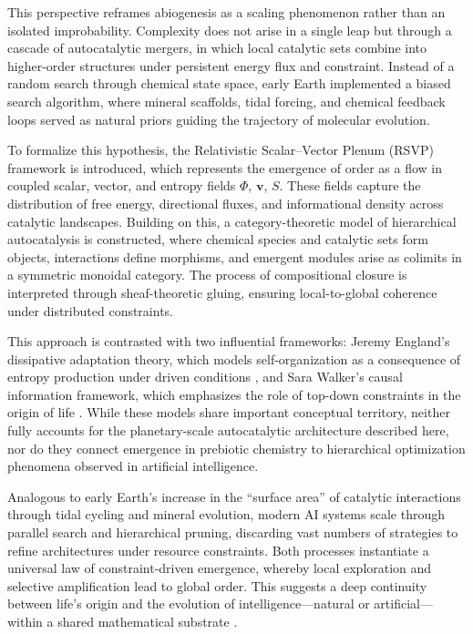 \documentclass{book}
\begin{document}
This perspective reframes abiogenesis as a scaling phenomenon rather than an isolated improbability. Complexity does not arise in a single leap but through a cascade of autocatalytic mergers, in which local catalytic sets combine into higher-order structures under persistent energy flux and constraint. Instead of a random search through chemical state space, early Earth implemented a biased search algorithm, where mineral scaffolds, tidal forcing, and chemical feedback loops served as natural priors guiding the trajectory of molecular evolution.

To formalize this hypothesis, the Relativistic Scalar–Vector Plenum (RSVP) framework is introduced, which represents the emergence of order as a flow in coupled scalar, vector, and entropy fields $\Phi$, $\mathbf{v}$, $S$. These fields capture the distribution of free energy, directional fluxes, and informational density across catalytic landscapes. Building on this, a category-theoretic model of hierarchical autocatalysis is constructed, where chemical species and catalytic sets form objects, interactions define morphisms, and emergent modules arise as colimits in a symmetric monoidal category. The process of compositional closure is interpreted through sheaf-theoretic gluing, ensuring local-to-global coherence under distributed constraints.

This approach is contrasted with two influential frameworks: Jeremy England’s dissipative adaptation theory, which models self-organization as a consequence of entropy production under driven conditions \citep{england2013,england2015}, and Sara Walker’s causal information framework, which emphasizes the role of top-down constraints in the origin of life \citep{walker2013,walker2017}. While these models share important conceptual territory, neither fully accounts for the planetary-scale autocatalytic architecture described here, nor do they connect emergence in prebiotic chemistry to hierarchical optimization phenomena observed in artificial intelligence.

Analogous to early Earth’s increase in the “surface area” of catalytic interactions through tidal cycling and mineral evolution, modern AI systems scale through parallel search and hierarchical pruning, discarding vast numbers of strategies to refine architectures under resource constraints. Both processes instantiate a universal law of constraint-driven emergence, whereby local exploration and selective amplification lead to global order. This suggests a deep continuity between life’s origin and the evolution of intelligence—natural or artificial—within a shared mathematical substrate \citep{day2024, scalinghypothesis}.
\end{document}
